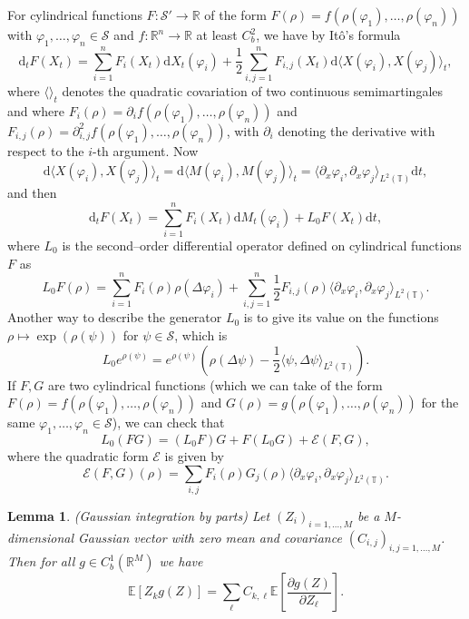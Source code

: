 \documentclass[a4paper,11pt]{article}
\newcommand{\mathd}{\mathrm{d}}
\newtheorem{lemma}{Lemma}
{\theorembodyfont{\rmfamily}\newtheorem{remark}{Remark}}
\newcommand{\CS}{\mathscr{S}}
\begin{document}
For cylindrical functions $F : \CS' \rightarrow \mathbb{R}$ of the form $F
(\rho) = f (\rho (\varphi_1), \ldots, \rho (\varphi_n))$ with $\varphi_1,
\ldots, \varphi_n \in \CS$ and $f : \mathbb{R}^n \rightarrow \mathbb{R}$ at
least $C^2_b$, we have by It{\^o}'s formula
\[ \mathd_t F (X_t) = \sum_{i = 1}^n F_i (X_t) \mathd X_t (\varphi_i) +
   \frac{1}{2} \sum_{i, j = 1}^n F_{i, j} (X_t) \mathd \langle X (\varphi_i),
   X (\varphi_j) \rangle_t, \]
where $\langle \rangle_t$ denotes the quadratic covariation of two continuous
semimartingales and where $F_i (\rho) = \partial_i f (\rho (\varphi_1),
\ldots, \rho (\varphi_n))$ and $F_{i, j} (\rho) = \partial_{i, j}^2 f (\rho
(\varphi_1), \ldots, \rho (\varphi_n))$, with $\partial_i$ denoting the
derivative with respect to the $i$-th argument. Now
\[ \mathd \langle X (\varphi_i), X (\varphi_j) \rangle_t = \mathd \langle M
   (\varphi_i), M (\varphi_j) \rangle_t = \langle \partial_x \varphi_i,
   \partial_x \varphi_j \rangle_{L^2 (\mathbb{T})} \mathd t, \]
and then
\[ \mathd_t F (X_t) = \sum_{i = 1}^n F_i (X_t) \mathd M_t (\varphi_i) + L_0 F
   (X_t) \mathd t, \]
where $L_0$ is the second--order differential operator defined on cylindrical
functions $F$ as
\begin{equation}
  L_0 F (\rho) = \sum_{i = 1}^n F_i (\rho) \rho (\Delta \varphi_i) + \sum_{i,
  j = 1}^n \frac{1}{2} F_{i, j} (\rho) \langle \partial_x \varphi_i,
  \partial_x \varphi_j \rangle_{L^2 (\mathbb{T})} .
\end{equation}
Another way to describe the generator $L_0$ is to give its value on the
functions $\rho \mapsto \exp (\rho (\psi))$ for $\psi \in \CS$, which is
\[ L_0 e^{\rho (\psi)} = e^{\rho (\psi)} (\rho (\Delta \psi) - \frac{1}{2}
   \langle \psi, \Delta \psi \rangle_{L^2 (\mathbb{T})}) . \]
If $F, G$ are two cylindrical functions (which we can take of the form $F
(\rho) = f (\rho (\varphi_1), \ldots, \rho (\varphi_n))$ and $G (\rho) = g
(\rho (\varphi_1), \ldots, \rho (\varphi_n))$ for the same $\varphi_1, \ldots,
\varphi_n \in \CS$), we can check that
\begin{equation}
  \label{eq:L0 and E} L_0 (F G) = (L_0 F) G + F (L_0 G) +\mathcal{E} (F, G),
\end{equation}
where the quadratic form $\mathcal{E}$ is given by
\begin{equation}
  \mathcal{E} (F, G) (\rho) = \sum_{i, j} F_i (\rho) G_j (\rho) \langle
  \partial_x \varphi_i, \partial_x \varphi_j \rangle_{L^2 (\mathbb{T})} .
\end{equation}
\begin{lemma}
  (Gaussian integration by parts) Let $(Z_i)_{i = 1, \ldots, M}$ be a
  $M$-dimensional Gaussian vector with zero mean and covariance $(C_{i,
  j})_{i, j = 1, \ldots, M}$. Then for all $g \in C^1_b (\mathbb{R}^M)$ we
  have
  \[ \mathbb{E} [Z_k g (Z)] = \sum_{\ell} C_{k, \ell} \mathbb{E} \left[
     \frac{\partial g (Z)}{\partial Z_{\ell}} \right] . \]
\end{lemma}
\end{document}
